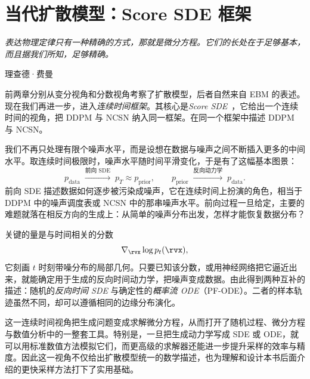 \chapter{当代扩散模型：Score SDE 框架}\label{ch:score-sde}

\epigraph{
    \textit{表达物理定律只有一种精确的方式，那就是微分方程。它们的长处在于足够基本，而且据我们所知，足够精确。
}}{理查德·费曼}


前两章分别从变分视角和分数视角考察了扩散模型，后者自然来自 EBM 的表述。现在我们再进一步，进入\emph{连续时间框架}。其核心是\emph{Score SDE}~\citep{song2020score}，它给出一个连续时间的视角，把 DDPM 与 NCSN 纳入同一框架。在同一个框架中描述 DDPM 与 NCSN。

我们不再只处理有限个噪声水平，而是设想在数据与噪声之间不断插入更多的中间水平。取连续时间极限时，噪声水平随时间平滑变化，于是有了这幅基本图景：
\[
    p_{\mathrm{data}}
    \;\xrightarrow{\text{前向 SDE}}\;
    p_T \approx p_{\mathrm{prior}},
    \qquad
    p_{\mathrm{prior}}
    \;\xrightarrow{\text{反向动力学}}\;
    p_{\mathrm{data}}.
\]
前向 SDE 描述数据如何逐步被污染成噪声，它在连续时间上扮演的角色，相当于 DDPM 中的噪声调度表或 NCSN 中的那串噪声水平。前向过程一旦给定，主要的难题就落在相反方向的生成上：从简单的噪声分布出发，怎样才能恢复数据分布？

关键的量是与时间相关的分数
\[
    \nabla_{\rvx}\log p_t(\rvx),
\]
它刻画 $t$ 时刻带噪分布的局部几何。只要已知该分数，或用神经网络把它逼近出来，就能确定用于生成的反向时间动力学，把噪声变成数据。由此得到两种互补的描述：随机的\emph{反向时间 SDE} 与确定性的\emph{概率流 ODE}（PF-ODE）。二者的样本轨迹虽然不同，却可以遵循相同的边缘分布演化。

这一连续时间视角把生成问题变成求解微分方程，从而打开了随机过程、微分方程与数值分析中的一整套工具。特别是，一旦把生成动力学写成 SDE 或 ODE，就可以用标准数值方法模拟它们，而更高级的求解器还能进一步提升采样的效率与精度。因此这一视角不仅给出扩散模型统一的数学描述，也为理解和设计本书后面介绍的更快采样方法打下了实用基础。


